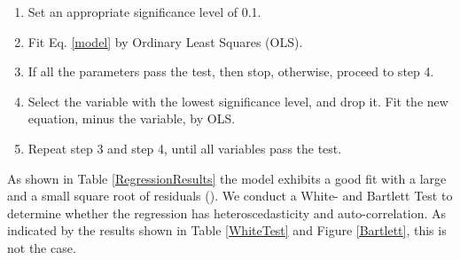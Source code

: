 \documentclass[10pt]{article}
\begin{document}
 \begin{enumerate}
	\item Set an appropriate significance level of 0.1.\\
	\item Fit Eq. \ref{model} by Ordinary Least Squares (OLS).\\
	\item If all the parameters pass the test, then stop, otherwise, proceed to step 4.\\
	\item Select the variable with the lowest significance level, and drop it. Fit the new equation, minus the variable, by OLS.\\
	\item Repeat step 3 and step 4, until all variables pass the test.
\end{enumerate}
 
As shown in Table \ref{RegressionResults} the model exhibits a good fit with a large  and a small square root of residuals (). We conduct a White- and Bartlett Test \cite{Bartlett1937,White1980} to determine whether the regression has heteroscedasticity and auto-correlation. As indicated by the results shown in Table \ref{WhiteTest} and Figure \ref{Bartlett}, this is not the case.\\
 
\end{document}
